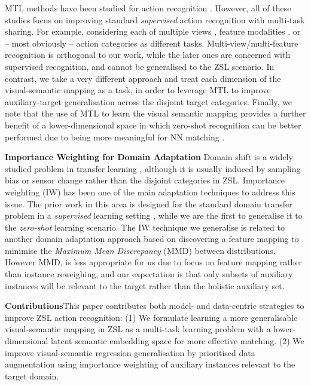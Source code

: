 \documentclass[runningheads]{llncs}
\begin{document}
MTL methods have been studied for action recognition
\cite{Zhou2013,yuan2013multi,liu2015single,mahasseni2013latent}. However,
all of these studies focus on improving standard {\em supervised} action
recognition with multi-task sharing. For example, considering each of
multiple views \cite{liu2015single,mahasseni2013latent}, feature
modalities \cite{yuan2013multi}, or -- most obviously -- action
categories \cite{Zhou2013} as different tasks. Multi-view/multi-feature 
recognition is orthogonal to our work, while the later ones are
concerned with supervised recognition, and cannot be 
generalised to the ZSL scenario. In contrast, we take a very
different approach and treat each dimension of the visual-semantic
mapping as a task, in order to leverage MTL to improve auxiliary-target
generalisation across the disjoint target categories. Finally, we
note that the use of MTL to learn the visual semantic mapping provides
a further benefit of a lower-dimensional space in which zero-shot
recognition can be better performed due to being more meaningful for
NN matching \cite{Beyer1999}.

\noindent\textbf{Importance Weighting for Domain Adaptation}\quad
Domain shift is a widely studied problem in transfer learning
\cite{Pan2010}, although it is usually induced by sampling bias
\cite{torralba2011dataset_bias,Huang2007} or sensor change
\cite{saenko2010domainAdapt} rather than the disjoint categories in
ZSL.  Importance weighting (IW) \cite{Sugiyama2007,Huang2007} has been one
of the main adaptation techniques to address this issue. The prior work in this
area is designed for the standard domain transfer problem in a
{\em supervised} learning setting \cite{Pardoe2010}, while we are the first to generalise it to the
{\em zero-shot} learning scenario. The IW technique we generalise is related to 
another domain adaptation approach based on  discovering a feature mapping
to minimise the \textit{Maximum Mean Discrepancy} (MMD) \cite{gretton2006kernel,baktashmotlagh2013unsupDA} between distributions. 
However MMD, is less appropriate for us due to focus on feature mapping rather
than instance reweighing, and our expectation is that 
only subsets of auxiliary instances will be relevant to
the target rather than the holistic auxiliary set. 

\noindent\textbf{Contributions}\quad This paper
contributes both model- and data-centric strategies to improve
ZSL action recognition: (1) We formulate learning a more
generalisable visual-semantic mapping in ZSL as a multi-task learning
problem with a lower-dimensional latent semantic embedding space for
more effective matching. (2) We improve visual-semantic regression
generalisation by prioritised data augmentation using importance
weighting of auxiliary instances relevant to the target domain.
\end{document}
